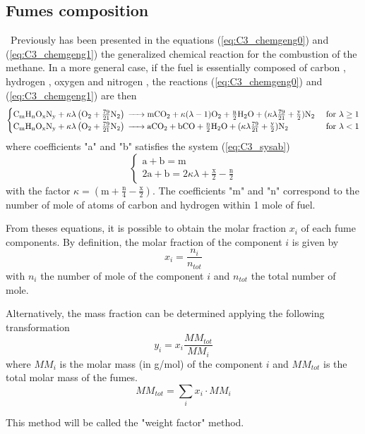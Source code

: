 \subsection{Fumes composition}
\quad\, Previously has been presented in the equations (\ref{eq:C3_chemgeng0}) and (\ref{eq:C3_chemgeng1}) the generalized chemical reaction for the combustion of the methane. 
In a more general case, if the fuel is essentially composed of carbon , hydrogen , oxygen  and nitrogen , the reactions (\ref{eq:C3_chemgeng0}) and (\ref{eq:C3_chemgeng1}) are then
\begin{equation}
\begin{cases}
\ce{C_{\text{m}}H_{\text{n}}O_{\text{x}}N_{\text{y}} +}\kappa\lambda \left(\ce{O2}+\frac{79}{21}\ce{N2}\right) \ce{-> mCO2 +} \kappa(\lambda-1)\ce{O2 + \frac{n}{2}H2O +} (\kappa\lambda\frac{79}{21} + \frac{\text{y}}{2})\ce{N2}&\text{ for $\lambda\geq 1$}\\
\ce{C_{\text{m}}H_{\text{n}}O_{\text{x}}N_{\text{y}} +}\kappa\lambda \left(\ce{O2}+\frac{79}{21}\ce{N2}\right) \ce{-> aCO2 + bCO + \frac{n}{2}H2O} + (\kappa\lambda\frac{79}{21} + \frac{\text{y}}{2})\ce{N2}&\text{ for $\lambda< 1$}
\end{cases}
\end{equation}
where coefficients "a" and "b" satisfies the system (\ref{eq:C3_sysab})
\begin{equation}
\begin{cases}
\text{a} + \text{b} = \text{m}\\
2\text{a} + \text{b} = 2\kappa\lambda + \frac{\text{x}}{2} - \frac{\text{n}}{2}
\end{cases}\label{eq:C3_sysab}
\end{equation}
with the factor $\kappa = (\text{m}+\frac{\text{n}}{4}-\frac{\text{x}}{2})$. The coefficients "m" and "n" correspond to the number of mole of atoms of carbon and hydrogen within 1 mole of fuel.

From theses equations, it is possible to obtain the molar fraction $x_i$ of each fume components. By definition, the molar fraction of the component $i$ is given by
\begin{equation}
x_i = \frac{n_i}{n_{tot}}
\end{equation}
with $n_i$ the number of mole of the component $i$ and $n_{tot}$ the total number of mole.

Alternatively, the mass fraction can be determined applying the following transformation
\begin{equation}
y_i = x_i\frac{MM_{tot}}{MM_i}
\end{equation}
where $MM_i$ is the molar mass (in g/mol) of the component $i$ and $MM_{tot}$ is the total molar mass of the fumes.
\begin{equation}
MM_{tot} = \sum_i x_i\cdot MM_i
\end{equation}

This method will be called the "weight factor" method. 
